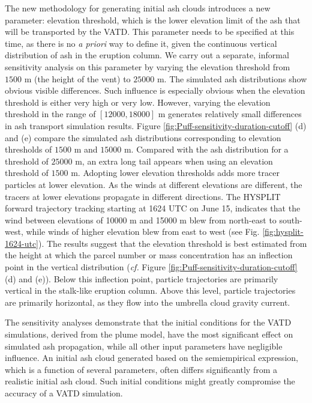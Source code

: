 \documentclass[utf8]{frontiersSCNS} %
\begin{document}
The new methodology for generating initial ash clouds introduces a new parameter: elevation threshold, which is the lower elevation limit of the ash that will be transported by the VATD.  This parameter needs to be specified at this time, as there is no {\it a priori} way to define it, given the continuous vertical distribution of ash in the eruption column. We carry out a separate, informal sensitivity analysis on this parameter by varying the elevation threshold from $1500 $ m (the height of the vent) to $25000 $ m. The simulated ash distributions show obvious visible differences. Such influence is especially obvious when the elevation threshold is either very high or very low. However, varying the elevation threshold in the range of $[12000, 18000] $ m generates relatively small differences in ash transport simulation results.  Figure \ref{fig:Puff-sensitivity-duration-cutoff} (d) and (e) compare the simulated ash distributions corresponding to elevation thresholds of $1500 $ m and $15000 $ m. Compared with the ash distribution for a threshold of $25000 $ m, an extra long tail appears when using an elevation threshold of $1500 $ m. Adopting lower elevation thresholds  adds more tracer particles at lower elevation. As the winds at different elevations are different, the tracers at lower elevations propagate in different directions. The HYSPLIT \citep{stein2015noaa, rolph2017real} forward trajectory tracking starting at 1624 UTC on June 15, indicates that the wind between elevations of 10000 m and 15000 m blew from north-east to south-west, while winds of higher elevation blew from east to west (see Fig. \ref{fig:hysplit-1624-utc}).  The results suggest that the elevation threshold is best estimated from the height at which the parcel number or mass concentration has an inflection point in the vertical distribution ({\it cf.} Figure \ref{fig:Puff-sensitivity-duration-cutoff}(d) and (e)).  Below this inflection point, particle trajectories are primarily vertical in the stalk-like eruption column.  Above this level, particle trajectories are primarily horizontal, as they flow into the umbrella cloud gravity current.   

The sensitivity analyses demonstrate that the initial conditions for the VATD simulations, derived from the plume model, have the most significant effect on simulated ash propagation, while all other input parameters have negligible influence. An initial ash cloud generated based on the semiempirical expression, which is a function of several parameters, often differs significantly from a realistic initial ash cloud. Such initial conditions might greatly compromise the accuracy of a VATD simulation.
\end{document}
